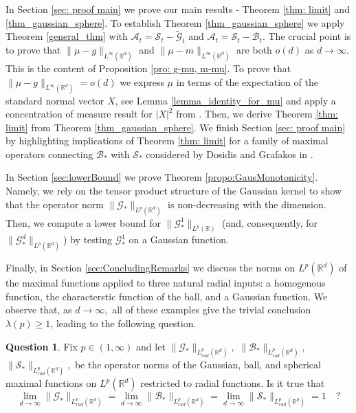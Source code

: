 \documentclass[a4paper, reqno]{amsart}
\theoremstyle{definition}
\newtheorem*{Que}{Question}
\newcommand{\R}{{\mathbb R}}
\newcommand{\mG}{\mathcal{G}}
\newcommand{\tmG}{\tilde{\mathcal{G}}}
\newcommand{\mB}{\mathcal{B}}
\newcommand{\mS}{\mathcal{S}}
\newcommand{\mA}{\mathcal{A}}
\newcommand{\lm}{\lambda}
\begin{document}
In Section \ref{sec: proof main} we prove our main results - Theorem \ref{thm: limit} and \ref{thm_gaussian_sphere}. To establish Theorem \ref{thm_gaussian_sphere} we apply Theorem \ref{general_thm} with $\mA_t=\mS_t-\tmG_t$ and $\mA_t=\mS_t-\mB_t.$ The crucial point is to prove that $\|\mu-g\|_{L^{\infty}(\R^d)}$ and  $\|\mu-m\|_{L^{\infty}(\R^d)}$ are both $o(d)$ as $d\to \infty.$ This is the content of Proposition \ref{pro: g-mu, m-mu}. To prove that
$\|\mu-g\|_{L^{\infty}(\R^d)}=o(d)$ we express $\mu$ in terms of the expectation of the standard normal vector $X$, see Lemma \ref{lemma_identity_for_mu} and apply a concentration of measure result for $|X|^2$ from \cite{LaMa}. %
Then, we derive Theorem \ref{thm: limit} from Theorem \ref{thm_gaussian_sphere}. We finish Section \ref{sec: proof main} by highlighting implications of Theorem \ref{thm: limit} for a family of maximal operators connecting $\mB_\ast$ with $\mS_\ast$ considered by Dosidis and Grafakos in \cite{DG21}.


In Section \ref{sec:lowerBound} we prove Theorem \ref{propo:GausMonotonicity}. Namely, we rely on the tensor product structure of the Gaussian kernel to show that the operator norm $\|\mG_\ast\|_{L^p(\mathbb{R}^d)}$ is non-decreasing with the dimension. Then, we compute a lower bound for $\|\mG_\ast^1\|_{L^p(\mathbb{R})}$ (and, consequently, for $\|\mG_\ast^d\|_{L^p(\mathbb{R}^d)}$) by testing $\mG_\ast^1$ on a Gaussian function. 

 Finally, in Section \ref{sec:ConcludingRemarks} we discuss the norms on $L^p(\R^d)$ of the maximal functions applied to three natural radial inputs: a homogenous function, the characterstic function of the ball, and a Gaussian function.  We observe that, as $d\to \infty,$ all of these examples give the trivial conclusion $\lm(p)\ge 1$, leading to the following question.
 \begin{Que}
	\label{que: limrad}
    Fix $p\in (1,\infty)$ and let
$\|\mG_*\|_{L^p_{rad}(\R^d)},$ $\|\mB_*\|_{L^p_{rad}(\R^d)},$ $\|\mS_*\|_{L^p_{rad}(\R^d)},$ be the operator norms of the Gaussian, ball, and spherical maximal functions on $L^p(\R^d)$ restricted to radial functions.
Is it true that
\begin{equation}
 \label{eq: limrad 1}
    \lim_{d\to\infty}   \|\mG_*\|_{L^p_{rad}(\R^d)} =\lim_{d\to\infty}   \|\mB_*\|_{L^p_{rad}(\R^d)}=\lim_{d\to\infty}   \|\mS_*\|_{L^p_{rad}(\R^d)}=1\quad  ?
    \end{equation}		
\end{Que}
\end{document}
